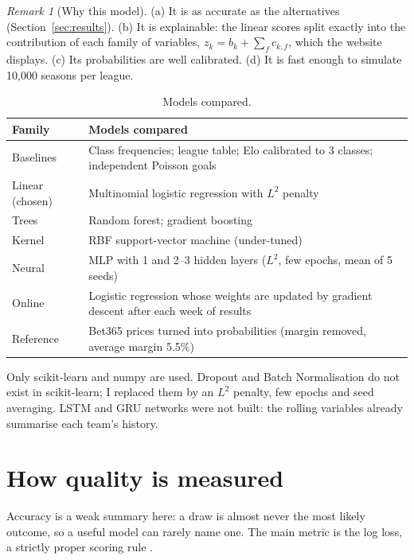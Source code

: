\documentclass[11pt,a4paper]{article}
\theoremstyle{definition}
\theoremstyle{remark}
\newtheorem{remark}{Remark}[section]
\begin{document}
\begin{remark}[Why this model]
(a) It is as accurate as the alternatives (Section~\ref{sec:results}). (b) It is explainable: the linear scores split exactly into the contribution of each family of variables,
$z_k=b_k+\sum_f c_{k,f}$, which the website displays. (c) Its probabilities are well calibrated. (d) It is fast enough to simulate 10{,}000 seasons per league.
\end{remark}

\begin{table}[H]
\caption{Models compared.}
\begin{center}
\small
\begin{tabular}{p{3.0cm}p{9.5cm}}
\toprule
\textbf{Family} & \textbf{Models compared} \\
\midrule
Baselines & Class frequencies; league table; Elo calibrated to 3 classes; independent Poisson goals \cite{dixon1997} \\
Linear (chosen) & Multinomial logistic regression with $L^2$ penalty \\
Trees & Random forest; gradient boosting \\
Kernel & RBF support-vector machine (under-tuned) \\
Neural & MLP with 1 and 2--3 hidden layers ($L^2$, few epochs, mean of 5 seeds) \\
Online & Logistic regression whose weights are updated by gradient descent after each week of results \\
Reference & Bet365 prices turned into probabilities (margin removed, average margin 5.5\%) \\
\bottomrule
\end{tabular}
\end{center}
\end{table}

Only scikit-learn \cite{pedregosa2011} and numpy are used. Dropout and Batch Normalisation do not exist in scikit-learn; I replaced them by an $L^2$ penalty, few epochs and seed averaging.
LSTM and GRU networks were not built: the rolling variables already summarise each team's history.

\section{How quality is measured}

Accuracy is a weak summary here: a draw is almost never the most likely outcome, so a useful model can rarely name one. The main metric is the log loss, a strictly proper scoring rule \cite{gneiting2007}.
\end{document}
